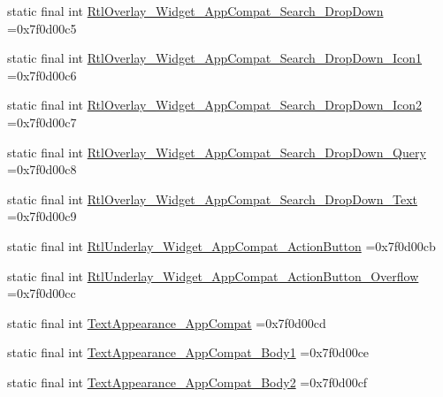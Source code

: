 \begin{DoxyCompactItemize}
\item 
static final int \mbox{\hyperlink{classbr_1_1unb_1_1cic_1_1mp_1_1marketmaster_1_1R_1_1style_a1a773190bb69ab38b41704f43520c252}{Rtl\+Overlay\+\_\+\+Widget\+\_\+\+App\+Compat\+\_\+\+Search\+\_\+\+Drop\+Down}} =0x7f0d00c5
\item 
static final int \mbox{\hyperlink{classbr_1_1unb_1_1cic_1_1mp_1_1marketmaster_1_1R_1_1style_a8fcec7daa34ced359d46034c95082b80}{Rtl\+Overlay\+\_\+\+Widget\+\_\+\+App\+Compat\+\_\+\+Search\+\_\+\+Drop\+Down\+\_\+\+Icon1}} =0x7f0d00c6
\item 
static final int \mbox{\hyperlink{classbr_1_1unb_1_1cic_1_1mp_1_1marketmaster_1_1R_1_1style_a7db25d7c068f8b01deb9b55f203545e6}{Rtl\+Overlay\+\_\+\+Widget\+\_\+\+App\+Compat\+\_\+\+Search\+\_\+\+Drop\+Down\+\_\+\+Icon2}} =0x7f0d00c7
\item 
static final int \mbox{\hyperlink{classbr_1_1unb_1_1cic_1_1mp_1_1marketmaster_1_1R_1_1style_af1fb139cc989e74fcf1997e7f3edfcd3}{Rtl\+Overlay\+\_\+\+Widget\+\_\+\+App\+Compat\+\_\+\+Search\+\_\+\+Drop\+Down\+\_\+\+Query}} =0x7f0d00c8
\item 
static final int \mbox{\hyperlink{classbr_1_1unb_1_1cic_1_1mp_1_1marketmaster_1_1R_1_1style_a71fec40b0822fa109f2d9e99af5dc33f}{Rtl\+Overlay\+\_\+\+Widget\+\_\+\+App\+Compat\+\_\+\+Search\+\_\+\+Drop\+Down\+\_\+\+Text}} =0x7f0d00c9
\item 
static final int \mbox{\hyperlink{classbr_1_1unb_1_1cic_1_1mp_1_1marketmaster_1_1R_1_1style_af5b6e24daf442d52fc038c5ac87edfb4}{Rtl\+Underlay\+\_\+\+Widget\+\_\+\+App\+Compat\+\_\+\+Action\+Button}} =0x7f0d00cb
\item 
static final int \mbox{\hyperlink{classbr_1_1unb_1_1cic_1_1mp_1_1marketmaster_1_1R_1_1style_aaf041565dbf739b142a1114115066cad}{Rtl\+Underlay\+\_\+\+Widget\+\_\+\+App\+Compat\+\_\+\+Action\+Button\+\_\+\+Overflow}} =0x7f0d00cc
\item 
static final int \mbox{\hyperlink{classbr_1_1unb_1_1cic_1_1mp_1_1marketmaster_1_1R_1_1style_a78d46d999ef761abb61664f40a857c70}{Text\+Appearance\+\_\+\+App\+Compat}} =0x7f0d00cd
\item 
static final int \mbox{\hyperlink{classbr_1_1unb_1_1cic_1_1mp_1_1marketmaster_1_1R_1_1style_a4518edaf8e40f171d2f2225c58935137}{Text\+Appearance\+\_\+\+App\+Compat\+\_\+\+Body1}} =0x7f0d00ce
\item 
static final int \mbox{\hyperlink{classbr_1_1unb_1_1cic_1_1mp_1_1marketmaster_1_1R_1_1style_acbf282bc94a8cf867c3ee52efaf5cb90}{Text\+Appearance\+\_\+\+App\+Compat\+\_\+\+Body2}} =0x7f0d00cf

\end{DoxyCompactItemize}
